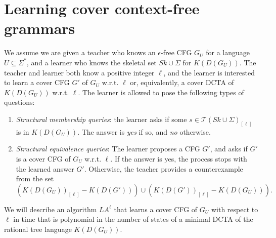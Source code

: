 \documentclass[preprint,12pt,english]{article}
\def\cT{\mathcal{T}}
\begin{document}
\section{Learning cover context-free grammars}
\label{sect4}
We assume we are given a teacher who knows an $\epsilon$-free CFG $G_U$ for a language $U\subseteq\Sigma^*$, and a learner who  knows the skeletal set $Sk\cup\Sigma$ for $K(D(G_U))$.  
The teacher and learner both know a positive integer $\ell$, and the learner is interested to learn a cover CFG $G'$ of $G_U$ w.r.t. $\ell$ or, equivalently, a cover DCTA of $K(D(G_U))$ w.r.t. $\ell$.
The learner is allowed to pose the following types of questions:
\begin{enumerate}
\item {\em Structural membership queries}: the learner asks if some $s\in\cT(Sk\cup\Sigma)_{[\ell]}$ is in $K(D(G_U))$. The answer is {\em yes} if so, and {\em no} otherwise.
\item {\em Structural equivalence queries}: The learner proposes a CFG $G'$, and asks if $G'$ is a cover CFG of $G_U$ w.r.t. $\ell$.  If the answer is {yes}, the  process stops with the learned answer $G'$. Otherwise, the teacher provides a counterexample from the set  $(K(D(G_U))_{[\ell]}-K(D(G')))\cup (K(D(G'))_{[\ell]}- K(D(G_U))).$
\end{enumerate}
We will describe an algorithm $LA^\ell$ that learns a cover CFG of $G_U$ with respect to $\ell$ in time that is polynomial in the number of states of a minimal DCTA of the rational tree language $K(D(G_U)).$
\end{document}

